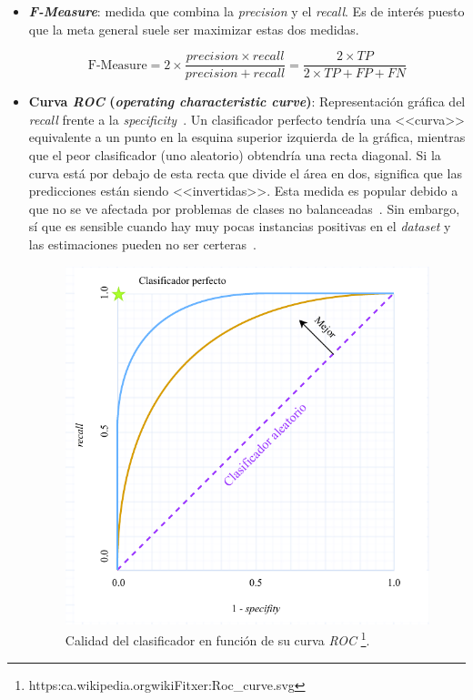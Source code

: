 \begin{itemize}
	
	\item \textbf{\textit{F-Measure}}: medida que combina la \textit{precision} y el \textit{recall}. Es de interés puesto que la meta general suele ser maximizar estas dos medidas.
	
	\begin{equation}\label{eqn:f-measure} \textrm{F-Measure} = 2 \times \frac{precision \times recall}{precision + recall} = \frac{ 2 \times TP}{2 \times TP + FP + FN} \end{equation}
	
	\item \textbf{Curva \textit{ROC} (\textit{operating characteristic curve})}: Representación gráfica del \textit{recall} frente a la \textit{specificity}~\cite{AUC2022google}. Un clasificador perfecto tendría una <<curva>> equivalente a un punto en la esquina superior izquierda de la gráfica, mientras que el peor clasificador (uno aleatorio) obtendría una recta diagonal. Si la curva está por debajo de esta recta que divide el área en dos, significa que las predicciones están siendo <<invertidas>>. Esta medida es popular debido a que no se ve afectada por problemas de clases no balanceadas~\cite{AUC2020imbalanced}. Sin embargo, sí que es sensible cuando hay muy pocas instancias positivas en el \textit{dataset} y las estimaciones pueden no ser certeras~\cite{leaningImbalanced2018Salvador}.
	
	\begin{figure}[h]
		\caption[Curva ROC]{Calidad del clasificador en función de su curva \textit{ROC} \footnote{ https:\/\/ca.wikipedia.org\/wiki\/Fitxer:Roc\_curve.svg }. }
		\label{img:curva_roc}
		\centering
		\includegraphics[scale=0.27]{../img/memoria/3_curva_roc}
	\end{figure}


\end{itemize}
